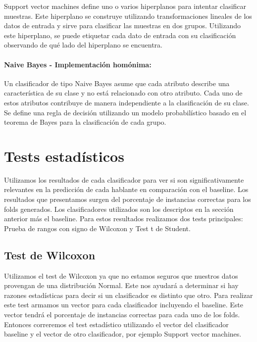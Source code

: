 
Support vector machines define uno o varios hiperplanos para intentar clasificar muestras. Este hiperplano se construye utilizando transformaciones lineales de los datos de entrada y sirve para clasificar las muestras en dos grupos. Utilizando este hiperplano, se puede etiquetar cada dato de entrada con su clasificación observando de qué lado del hiperplano se encuentra.

\paragraph{Naive Bayes \cite{DBLP:conf/flairs/Zhang04} - Implementación homónima:}


Un clasificador de tipo Naive Bayes asume que cada atributo describe una característica de su clase y no está relacionado con otro atributo. Cada uno de estos atributos contribuye de manera independiente a la clasificación de su clase. Se define una regla de decisión utilizando un modelo probabilístico basado en el teorema de Bayes para la clasificación de cada grupo.

\section{Tests estadísticos}

Utilizamos los resultados de cada clasificador para ver si son significativamente relevantes en la predicción de cada hablante en comparación con el baseline. Los resultados que presentamos surgen del porcentaje de instancias correctas para los folds generados. Los clasificadores utilizados son los descriptos en la sección anterior más el baseline. Para estos resultados realizamos dos tests principales: Prueba de rangos con signo de Wilcoxon y Test t de Student. 

\subsection{Test de Wilcoxon}

Utilizamos el test de Wilcoxon ya que no estamos seguros que nuestros datos provengan de una distribución Normal. Este nos ayudará a determinar si hay razones estadísticas para decir si un clasificador es distinto que otro. Para realizar este test armamos un vector para cada clasificador incluyendo el baseline. Este vector tendrá el porcentaje de instancias correctas para cada uno de los folds. Entonces correremos el test estadístico utilizando el vector del clasificador baseline y el vector de otro clasificador, por ejemplo Support vector machines.

